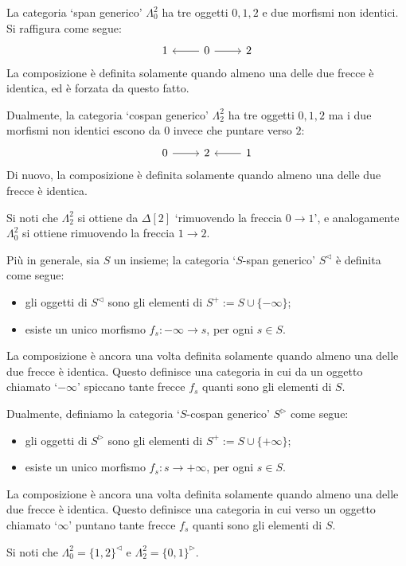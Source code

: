 \begin{example}\label{ex_spancospan}
	La categoria `span generico' \(\Lambda^2_0\) ha tre oggetti \(0,1,2\) e due morfismi non identici. Si raffigura come segue:
	\[\begin{tikzcd}
			1 & 0 \ar[r]\ar[l] & 2
		\end{tikzcd}\]
	La composizione è definita solamente quando almeno una delle due frecce è identica, ed è forzata da questo fatto.

	Dualmente, la categoria `cospan generico' \(\Lambda^2_2\) ha tre oggetti \(0,1,2\) ma i due morfismi non identici escono da \(0\) invece che puntare verso \(2\):
	\[\begin{tikzcd}
			0\ar[r] & 2 & 1\ar[l]
		\end{tikzcd}\]
	Di nuovo, la composizione è definita solamente quando almeno una delle due frecce è identica.

	Si noti che \(\Lambda^2_2\) si ottiene da \(\Delta[2]\) `rimuovendo la freccia \(0\to 1\)', e analogamente \(\Lambda^2_0\) si ottiene rimuovendo la freccia \(1\to 2\).

	Più in generale, sia \(S\) un insieme; la categoria `\(S\)-span generico' \(S^\lhd\) è definita come segue:
	\begin{itemize}
		\item gli oggetti di \(S^\lhd\) sono gli elementi di \(S^+ := S\cup \{-\infty\}\);
		\item esiste un unico morfismo \(f_s : -\infty\to s\), per ogni \(s\in S\).
	\end{itemize}
	La composizione è ancora una volta definita solamente quando almeno una delle due frecce è identica. Questo definisce una categoria in cui da un oggetto chiamato `\(-\infty\)' spiccano tante frecce \(f_s\) quanti sono gli elementi di \(S\).

	Dualmente, definiamo la categoria `\(S\)-cospan generico' \(S^\rhd\) come segue:
	\begin{itemize}
		\item gli oggetti di \(S^\rhd\) sono gli elementi di \(S^+ := S\cup \{+\infty\}\);
		\item esiste un unico morfismo \(f_s : s\to+\infty\), per ogni \(s\in S\).
	\end{itemize}
	La composizione è ancora una volta definita solamente quando almeno una delle due frecce è identica. Questo definisce una categoria in cui verso un oggetto chiamato `\(\infty\)' puntano tante frecce \(f_s\) quanti sono gli elementi di \(S\).

	Si noti che \(\Lambda^2_0=\{1,2\}^\lhd\) e \(\Lambda^2_2=\{0,1\}^\rhd\).
\end{example}
